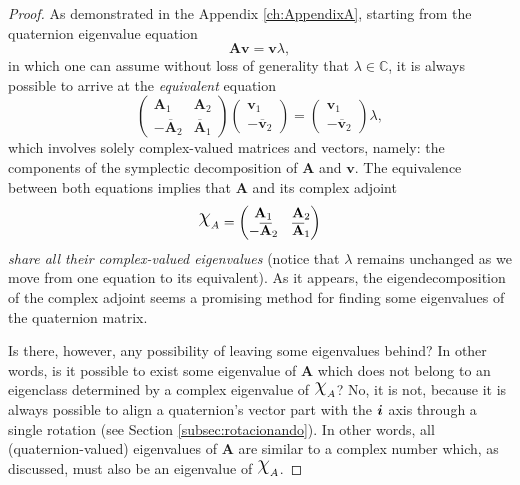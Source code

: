 \begin{proof}
As demonstrated in the Appendix \ref{ch:AppendixA}, starting from the quaternion eigenvalue equation
\begin{equation}
\mathbf{A} \mathbf{v} = \mathbf{v} \lambda,
\end{equation}
in which one can assume without loss of generality that $ \lambda \in \mathbb{C} $, it is always possible to arrive at the \emph{equivalent} equation
\begin{equation}
\label{eq:eigvalueequation}
\begin{pmatrix}
\mathbf{A}_1 & \mathbf{A}_2\\ 
- \overline{\mathbf{A}}_2 & \overline{\mathbf{A}}_1
\end{pmatrix}
\begin{pmatrix}
\mathbf{v}_1 \\ 
- \overline{\mathbf{v}}_2
\end{pmatrix} =
\begin{pmatrix}
\mathbf{v}_1 \\ 
- \overline{\mathbf{v}}_2
\end{pmatrix}
\lambda,
\end{equation}
which involves solely complex-valued matrices and vectors, namely: the components of the symplectic decomposition of $ \mathbf{A} $ and $ \mathbf{v} $. The equivalence between both equations implies that $\mathbf{A}$ and its complex adjoint
\begin{equation}
\rchi_A = 
\begin{pmatrix}
\mathbf{A}_1 & \mathbf{A}_2\\ 
- \overline{\mathbf{A}}_2 & \overline{\mathbf{A}}_1
\end{pmatrix}
\end{equation}
\textit{share all their complex-valued eigenvalues} (notice that $\lambda$ remains unchanged as we move from one equation to its equivalent). As it appears, the eigendecomposition of the complex adjoint seems a promising method for finding some eigenvalues of the quaternion matrix.

Is there, however, any possibility of leaving some eigenvalues behind? In other words, is it possible to exist some eigenvalue of $\mathbf{A}$ which does not belong to an eigenclass determined by a complex eigenvalue of $\rchi_A$? No, it is not, because it is always possible to align a quaternion's vector part with the $\boldsymbol{i}$ axis through a single rotation (see Section \ref{subsec:rotacionando}). In other words,
all (quaternion-valued) eigenvalues of $\mathbf{A}$ are similar to a complex number which, as discussed, must also be an eigenvalue of $\rchi_A$.


\end{proof}
